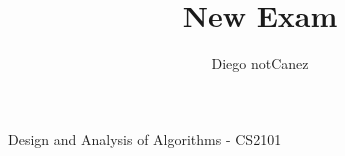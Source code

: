 \documentclass{article}
\title{New Exam}
\author{Diego notCanez}
\begin{document}
\maketitle
\begin{center}
Design and Analysis of Algorithms - CS2101
\end{center}
\end{document}
